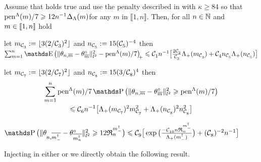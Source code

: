\begin{lm}\label{ak:re:nd:rest}
Assume that  holds true and use the penalty described in  with $\kappa \geq 84$ so that $\operatorname{pen}^{\Lambda}(m)/7 \geqslant 12 n^{-1} \Delta_{\Lambda}(m)$for any $m$ in $\llbracket 1, n \rrbracket$.
Then, for all $n\in{\mathbb N}$ and $m\in{\llbracket 1,n\rrbracket }$ hold
  \begin{resListeN}[]
  \item\label{ak:re:nd:rest1} let $m_{{\mathcal C}^{}_{3}}:=\lfloor   3(2/{\mathcal C}^{}_{3})^2\rfloor$ and $n_{{\mathcal C}^{}_{5}}:={15({\mathcal C}^{}_{5})^{-4}}$ then\\ 
    $\sum_{\Di=1}^{\ssY}\E
    \vectp{\Vnormlp{\txdfPr-\xdfPr}^2-\penSv/7}
    \leq \cst{1}\ssY^{-1}\big[\tfrac{2 \cst{2}}{\cst{3}}\miSv[\Di_{\cst{3}}] + \cst{4} \ssY_{\cst{5}} \miSv[\ssY_{\cst{5}}]\big]$
  \item\label{ak:re:nd:rest2} let
    $m_{{\mathcal C}^{}_{7}}:=\lfloor 3(2 / {\mathcal C}^{}_{7})^2\rfloor$ and
    $n_{{\mathcal C}^{}_{8}}:=15(3/{\mathcal C}^{}_{8})^4$ then
    \begin{multline*}
    \sum_{\Di=1}^{\ssY}\penSv/7\P\big(\Vnormlp{\txdfPr-\xdfPr}^2\geq\penSv/7\big)\\
    \leq\cst{6} n^{-1} \big[\miSv[\Di_{\cst{7}}]^2\Di_{\cst{7}}^2+\miSv[\ssY_{\cst{8}}]^2 \ssY_{\cst{8}}^{2}\big]
    \end{multline*}
  \item\label{ak:re:nd:rest3} 
  $\P\big(\Vnormlp{\theta_{n, \overline{m^{\dagger}_{-}}}-\theta^{\circ}_{\overline{m^{\dagger}_{n}}}}^2 \geq 12\daRaS{\mdDi}{\xdf,\Lambda}\big)\leq 
    \cst{9} \big[\exp\big(\tfrac{-\cst{10}\ssY\daRaS{\mdDi}{\xdf,\Lambda}}{\Lambda_{+}(\mdDi)}\big)+(\cst{8})^{-2}\ssY^{-1}\big]$
  \end{resListeN}
  \reEnd
\end{lm}


Injecting  in either  or  we directly obtain the following result.

